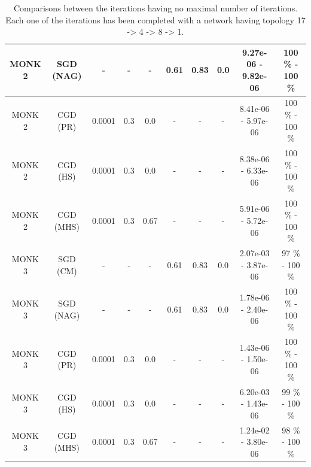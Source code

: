 \begin{table}[H]
\begin{subtable}{\textwidth}
{\begin{tabular}{| c | c | c | c | c | c | c | c | c | c |}
                            \hline
                            MONK 2 &  SGD (NAG) &        - &        - &     - &  0.61 &   0.83 &  0.0 &  9.27e-06 - 9.82e-06 &  100 \% - 100 \% \\
                            \hline
                            MONK 2 &   CGD (PR) &   0.0001 &     0.3 &  0.0 &     - &      - &       - &  8.41e-06 - 5.97e-06 &  100 \% - 100 \% \\
                            \hline
                            MONK 2 &   CGD (HS) &   0.0001 &     0.3 &  0.0 &     - &      - &       - &  8.38e-06 - 6.33e-06 &  100 \% - 100 \% \\
                            \hline
                            \rowcolor[gray]{.9}
                            MONK 2 &  CGD (MHS) &   0.0001 &     0.3 &  0.67 &     - &      - &       - &  5.91e-06 - 5.72e-06 &  100 \% - 100 \% \\
                            \hline
                            \hline
                            MONK 3 &   SGD (CM) &        - &        - &     - &  0.61 &   0.83 &  0.0 &  2.07e-03 - 3.87e-06 &  97 \% - 100 \% \\
                            \hline
                            MONK 3 &  SGD (NAG) &        - &        - &     - &  0.61 &   0.83 &  0.0 &  1.78e-06 - 2.40e-06 &  100 \% - 100 \% \\
                            \hline
                            \rowcolor[gray]{.9}
                            MONK 3 &   CGD (PR) &   0.0001 &     0.3 &  0.0 &     - &      - &       - &  1.43e-06 - 1.50e-06 &  100 \% - 100 \% \\
                            \hline
                            MONK 3 &   CGD (HS) &   0.0001 &     0.3 &  0.0 &     - &      - &       - &  6.20e-03 - 1.43e-06 &  99 \% - 100 \% \\
                            \hline
                            MONK 3 &  CGD (MHS) &   0.0001 &     0.3 &  0.67 &     - &      - &       - &  1.24e-02 - 3.80e-06 &  98 \% - 100 \% \\
                            \hline
                        \end{tabular}
                    }
                \end{subtable}
                \caption{Comparisons between the iterations having no maximal number of iterations. Each one of the
                iterations has been completed with a network having topology 17 -> 4 -> 8 -> 1.}
                \label{tab:monks_no_max_iterations}
            \end{table}

